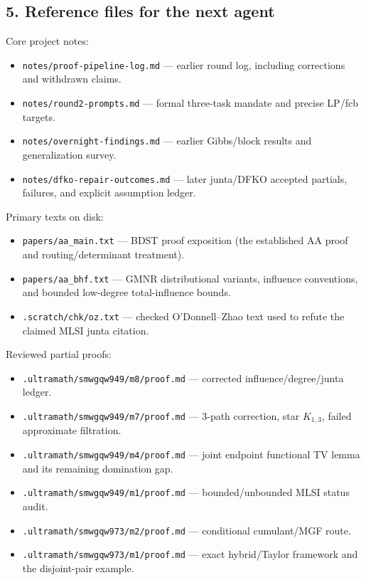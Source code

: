 \subsection{5. Reference files for the next agent}\label{reference-files-for-the-next-agent}

Core project notes:

\begin{itemize}
\tightlist
\item
  \texttt{notes/proof-pipeline-log.md} --- earlier round log, including corrections and withdrawn claims.
\item
  \texttt{notes/round2-prompts.md} --- formal three-task mandate and precise LP/fcb targets.
\item
  \texttt{notes/overnight-findings.md} --- earlier Gibbs/block results and generalization survey.
\item
  \texttt{notes/dfko-repair-outcomes.md} --- later junta/DFKO accepted partials, failures, and explicit assumption ledger.
\end{itemize}

Primary texts on disk:

\begin{itemize}
\tightlist
\item
  \texttt{papers/aa\_main.txt} --- BDST proof exposition (the established AA proof and routing/determinant treatment).
\item
  \texttt{papers/aa\_bhf.txt} --- GMNR distributional variants, influence conventions, and bounded low-degree total-influence bounds.
\item
  \texttt{.scratch/chk/oz.txt} --- checked O'Donnell--Zhao text used to refute the claimed MLSI junta citation.
\end{itemize}

Reviewed partial proofs:

\begin{itemize}
\tightlist
\item
  \texttt{.ultramath/smwgqw949/m8/proof.md} --- corrected influence/degree/junta ledger.
\item
  \texttt{.ultramath/smwgqw949/m7/proof.md} --- 3-path correction, star \(K_{1,3}\), failed approximate filtration.
\item
  \texttt{.ultramath/smwgqw949/m4/proof.md} --- joint endpoint functional TV lemma and its remaining domination gap.
\item
  \texttt{.ultramath/smwgqw949/m1/proof.md} --- bounded/unbounded MLSI status audit.
\item
  \texttt{.ultramath/smwgqw973/m2/proof.md} --- conditional cumulant/MGF route.
\item
  \texttt{.ultramath/smwgqw973/m1/proof.md} --- exact hybrid/Taylor framework and the disjoint-pair example.
\end{itemize}

